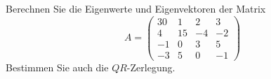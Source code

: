 \begin{aufg}[0]
Berechnen Sie die Eigenwerte und Eigenvektoren der Matrix
\[ A = \left( \begin{array}{cccc}
30 & 1 & 2 & 3\\
4 & 15 & -4 & -2\\
-1 & 0 & 3 & 5\\
-3 & 5 & 0 & -1 \end{array}
\right) \]
Bestimmen Sie auch die $QR$-Zerlegung.
\end{aufg}